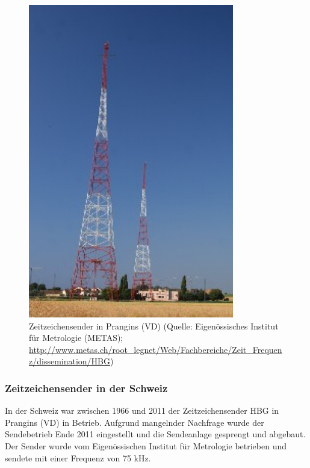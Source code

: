 \newpage 

\begin{figure}
  \centering
    \includegraphics[width=0.8\textwidth]{./images/Analyse/Prangings_VD_CH.jpg}
  \caption[Zeitzeichensender in Prangins (VD)]{Zeitzeichensender in Prangins (VD) (Quelle: Eigenössisches Institut für Metrologie (METAS); \url{http://www.metas.ch/root_legnet/Web/Fachbereiche/Zeit_Frequenz/dissemination/HBG})} 
\end{figure}

\paragraph{}

\subsubsection{Zeitzeichensender in der Schweiz}

In der Schweiz war zwischen 1966 und 2011 der Zeitzeichensender HBG in Prangins (VD) in Betrieb. Aufgrund mangelnder Nachfrage wurde der Sendebetrieb Ende 2011 eingestellt und die Sendeanlage gesprengt und abgebaut. Der Sender wurde vom Eigenössischen Institut für Metrologie betrieben und sendete mit einer Frequenz von 75 kHz.

